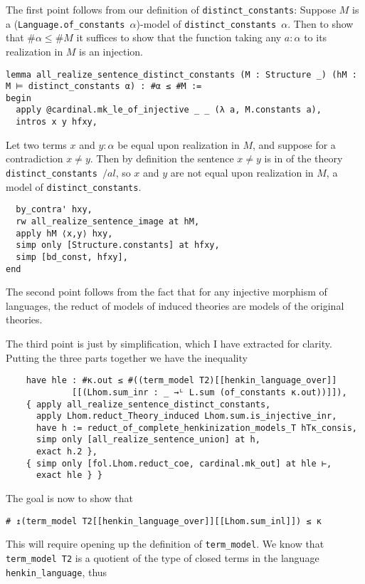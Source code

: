 \documentclass{article}
\newcommand{\al}{\alpha}
\newcommand{\<}{\langle}
\renewcommand{\>}{\rangle}
\theoremstyle{definitionstyle}
\theoremstyle{exercisestyle}
\theoremstyle{remarkstyle}
\begin{document}
The first point follows from our definition of \texttt{distinct\_constants}:
Suppose $M$ is a (\texttt{Language.of\_constants $\al$})-model of
\texttt{distinct\_constants $\al$}.
Then to show that $\# \al \le \# M$ it suffices to show that the function
taking any $a : \al$ to its realization in $M$ is an injection.
\begin{lstlisting}
lemma all_realize_sentence_distinct_constants (M : Structure _) (hM : M ⊨ distinct_constants α) : #α ≤ #M :=
begin
  apply @cardinal.mk_le_of_injective _ _ (λ a, M.constants a),
  intros x y hfxy, \end{lstlisting}
Let two terms $x$ and $y : \al$ be equal upon realization in $M$,
and suppose for a contradiction $x \ne y$.
Then by definition the sentence $x \ne y$ is in
of the theory \texttt{distinct\_constants $/al$}, so
$x$ and $y$ are not equal upon realization in $M$,
a model of \texttt{distinct\_constants}.
\begin{lstlisting}
  by_contra' hxy,
  rw all_realize_sentence_image at hM,
  apply hM ⟨x,y⟩ hxy,
  simp only [Structure.constants] at hfxy,
  simp [bd_const, hfxy],
end \end{lstlisting}

The second point follows from the fact that
for any injective morphism of languages,
the reduct of models of induced theories are models of the original theories.

The third point is just by simplification, which I have extracted for clarity.
Putting the three parts together we have the inequality
\begin{lstlisting}
    have hle : #κ.out ≤ #((term_model T2)[[henkin_language_over]]
             [[(Lhom.sum_inr : _ →ᴸ L.sum (of_constants κ.out))]]),
    { apply all_realize_sentence_distinct_constants,
      apply Lhom.reduct_Theory_induced Lhom.sum.is_injective_inr,
      have h := reduct_of_complete_henkinization_models_T hTκ_consis,
      simp only [all_realize_sentence_union] at h,
      exact h.2 },
    { simp only [fol.Lhom.reduct_coe, cardinal.mk_out] at hle ⊢,
      exact hle } } \end{lstlisting}

The goal is now to show that
\begin{lstlisting}
# ↥(term_model T2[[henkin_language_over]][[Lhom.sum_inl]]) ≤ κ \end{lstlisting}
This will require opening up the definition of \texttt{term\_model}.
We know that \texttt{term\_model T2} is a quotient of the type of closed
terms in the language \texttt{henkin\_language}, thus
\end{document}

